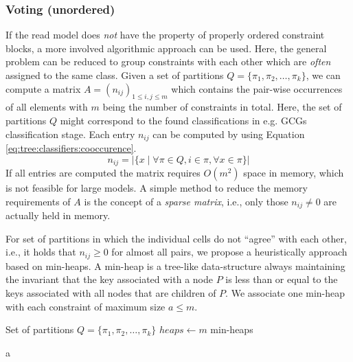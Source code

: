 			\subsubsection{Voting (unordered)}
			\label{chap:tree:classifiers:cooccurence}

				If the read model does \textit{not} have the property of properly ordered constraint blocks, a more involved algorithmic approach can be used.
				Here, the general problem can be reduced to group constraints with each other which are \textit{often} assigned to the same class.
				Given a set of partitions $Q = \{ \pi_1, \pi_2, \ldots, \pi_k \}$, we can compute a matrix  $A = (n_{ij})_{1 \leq i, j \leq m}$ which contains the pair-wise occurrences of all elements with $m$ being the number of constraints in total.
				Here, the set of partitions $Q$ might correspond to the found classifications in e.g. \ac{GCG}s classification stage.
				Each entry $n_{ij}$ can be computed by using Equation \ref{eq:tree:classifiers:cooccurence}.
				\begin{equation}
				\label{eq:tree:classifiers:cooccurence}
					n_{ij} = | \{ x \mid \forall \pi \in Q, i \in \pi, \forall x \in \pi \} |
				\end{equation}
				If all entries are computed the matrix requires $O(m^2)$ space in memory, which is not feasible for large models. A simple method to reduce the memory requirements of $A$ is the concept of a \textit{sparse matrix}, i.e., only those $n_{ij} \neq 0$ are actually held in memory.

				For set of partitions in which the individual cells do not \enquote{agree} with each other, i.e., it holds that $n_{ij} \geq 0$ for almost all pairs, we propose a heuristically approach based on min-heaps.
				A min-heap is a tree-like data-structure always maintaining the invariant that the key associated with a node $P$ is less than or equal to the keys associated with all nodes that are children of $P$.
				We associate one min-heap with each constraint of maximum size $a \leq m$.

				\begin{algorithm}[ht!]
					\centering
					\begin{algorithmic}
						\Require Set of partitions $Q = \{ \pi_1, \pi_2, \ldots, \pi_k \}$
						\Statex
							\State $heaps \gets m$ min-heaps
									\State {}
								\EndFor
							\EndFor
						\EndFunction
					\end{algorithmic}
					\caption{a}
					\label{algo:tree:classifiers:cooccurence}
				\end{algorithm}

